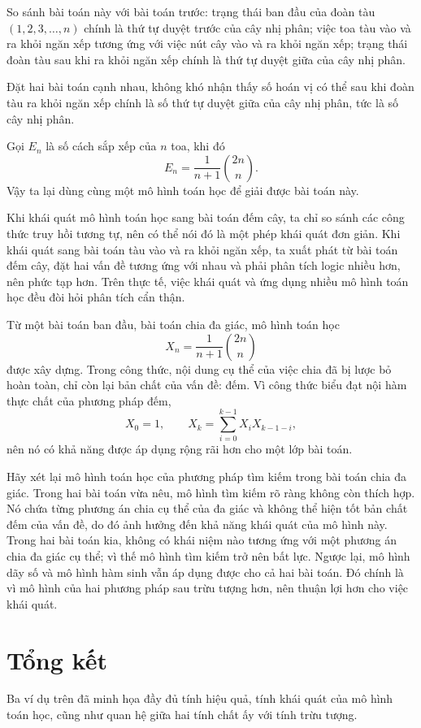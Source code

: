 \documentclass[11pt]{article}
\begin{document}
So sánh bài toán này với bài toán trước: trạng thái ban đầu của đoàn tàu
\((1,2,3,\ldots,n)\) chính là thứ tự duyệt trước của cây nhị phân; việc toa
tàu vào và ra khỏi ngăn xếp tương ứng với việc nút cây vào và ra khỏi ngăn
xếp; trạng thái đoàn tàu sau khi ra khỏi ngăn xếp chính là thứ tự duyệt giữa
của cây nhị phân.

Đặt hai bài toán cạnh nhau, không khó nhận thấy số hoán vị có thể sau khi
đoàn tàu ra khỏi ngăn xếp chính là số thứ tự duyệt giữa của cây nhị phân, tức
là số cây nhị phân.

Gọi \(E_n\) là số cách sắp xếp của \(n\) toa, khi đó
\[
  E_n=\frac{1}{n+1}\binom{2n}{n}. \tag{9}
\]
Vậy ta lại dùng cùng một mô hình toán học để giải được bài toán này.

Khi khái quát mô hình toán học sang bài toán đếm cây, ta chỉ so sánh các công
thức truy hồi tương tự, nên có thể nói đó là một phép khái quát đơn giản. Khi
khái quát sang bài toán tàu vào và ra khỏi ngăn xếp, ta xuất phát từ bài toán
đếm cây, đặt hai vấn đề tương ứng với nhau và phải phân tích logic nhiều hơn,
nên phức tạp hơn. Trên thực tế, việc khái quát và ứng dụng nhiều mô hình toán
học đều đòi hỏi phân tích cẩn thận.

Từ một bài toán ban đầu, bài toán chia đa giác, mô hình toán học
\[
  X_n=\frac{1}{n+1}\binom{2n}{n}
\]
được xây dựng. Trong công thức, nội dung cụ thể của việc chia đã bị lược bỏ
hoàn toàn, chỉ còn lại bản chất của vấn đề: đếm. Vì công thức biểu đạt nội
hàm thực chất của phương pháp đếm,
\[
  X_0=1,\qquad X_k=\sum_{i=0}^{k-1}X_iX_{k-1-i},
\]
nên nó có khả năng được áp dụng rộng rãi hơn cho một lớp bài toán.

Hãy xét lại mô hình toán học của phương pháp tìm kiếm trong bài toán chia đa
giác. Trong hai bài toán vừa nêu, mô hình tìm kiếm rõ ràng không còn thích
hợp. Nó chứa từng phương án chia cụ thể của đa giác và không thể hiện tốt bản
chất đếm của vấn đề, do đó ảnh hưởng đến khả năng khái quát của mô hình này.
Trong hai bài toán kia, không có khái niệm nào tương ứng với một phương án
chia đa giác cụ thể; vì thế mô hình tìm kiếm trở nên bất lực. Ngược lại, mô
hình dãy số và mô hình hàm sinh vẫn áp dụng được cho cả hai bài toán. Đó
chính là vì mô hình của hai phương pháp sau trừu tượng hơn, nên thuận lợi hơn
cho việc khái quát.

\section{Tổng kết}

Ba ví dụ trên đã minh họa đầy đủ tính hiệu quả, tính khái quát của mô hình
toán học, cũng như quan hệ giữa hai tính chất ấy với tính trừu tượng.
\end{document}
